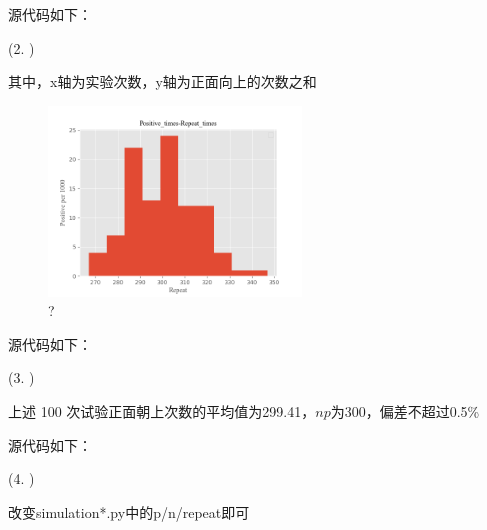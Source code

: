 \documentclass{article}
\begin{document}
源代码如下：



(2. )

其中，x轴为实验次数，y轴为正面向上的次数之和

\begin{center}
    \begin{figure}[H] %
        \centering %
        \includegraphics[width=0.6\textwidth]{img/Figure_2.png} %
        \caption{?} %
        \label{fig2} %
    \end{figure}
\end{center}

源代码如下：



(3. )

上述 100 次试验正面朝上次数的平均值为299.41，$np$为300，偏差不超过0.5\%

源代码如下：



(4. )

改变simulation*.py中的p/n/repeat即可
\end{document}
